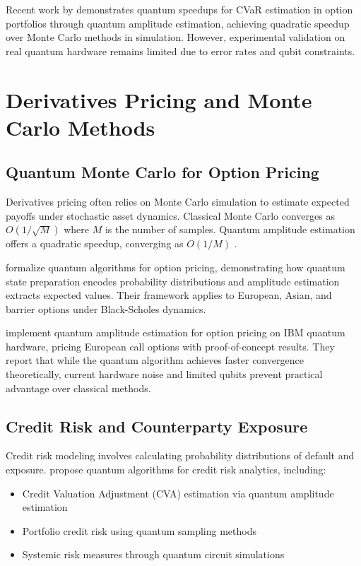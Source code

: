 \documentclass[12pt]{article}
\numberwithin{equation}{section}
\begin{document}
Recent work by \citet{Woerner2019QAEOptions} demonstrates quantum speedups for CVaR estimation in option portfolios through quantum amplitude estimation, achieving quadratic speedup over Monte Carlo methods in simulation. However, experimental validation on real quantum hardware remains limited due to error rates and qubit constraints.

\section{Derivatives Pricing and Monte Carlo Methods}
\label{sec:pricing}

\subsection{Quantum Monte Carlo for Option Pricing}

Derivatives pricing often relies on Monte Carlo simulation to estimate expected payoffs under stochastic asset dynamics. Classical Monte Carlo converges as $O(1/\sqrt{M})$ where $M$ is the number of samples. Quantum amplitude estimation offers a quadratic speedup, converging as $O(1/M)$ \citep{Brassard2002QAE}.

\citet{Rebentrost2018QuantumFinance} formalize quantum algorithms for option pricing, demonstrating how quantum state preparation encodes probability distributions and amplitude estimation extracts expected values. Their framework applies to European, Asian, and barrier options under Black-Scholes dynamics.

\citet{Stamatopoulos2020QAE} implement quantum amplitude estimation for option pricing on IBM quantum hardware, pricing European call options with proof-of-concept results. They report that while the quantum algorithm achieves faster convergence theoretically, current hardware noise and limited qubits prevent practical advantage over classical methods.

\subsection{Credit Risk and Counterparty Exposure}

Credit risk modeling involves calculating probability distributions of default and exposure. \citet{Egger2020QuantumFinance} propose quantum algorithms for credit risk analytics, including:

\begin{itemize}[leftmargin=*]
\item Credit Valuation Adjustment (CVA) estimation via quantum amplitude estimation
\item Portfolio credit risk using quantum sampling methods
\item Systemic risk measures through quantum circuit simulations
\end{itemize}
\end{document}
